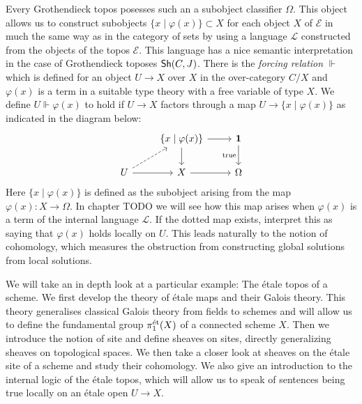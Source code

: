 Every Grothendieck topos posesses such an a subobject classifier $\Omega$. This object allows us to construct subobjects $\{x \mid \varphi(x)\} \subset X$ for each object $X$ of $\mathcal{E}$ in much the same way as in the category of sets by using a language $\mathcal{L}$ constructed from the objects of the topos $\mathcal{E}$. This language has a nice semantic interpretation in the case of Grothendieck toposes $\operatorname{\mathsf{Sh}}(C,J)$. There is the \textit{forcing relation} $\Vdash$ which is defined for an object $U \to X$ over $X$ in the over-category $C/X$ and $\varphi(x)$ is a term in a suitable type theory with a free variable of type $X$. We define $U \Vdash \varphi(x)$ to hold if $U \to X$ factors through a map $U \to \{x \mid \varphi(x)\}$ as indicated in the diagram below:
\[
	\begin{tikzcd}
		& {\{x \mid \varphi(x)\}} & {\mathbf{1}} \\
		U & X & \Omega
		\arrow[from=2-1, to=2-2]
		\arrow[dashed, from=2-1, to=1-2]
		\arrow[from=1-2, to=1-3]
		\arrow["{\text{true}}"', from=1-3, to=2-3]
		\arrow[from=1-2, to=2-2]
		\arrow[from=2-2, to=2-3]
	\end{tikzcd}
\]
Here $\{ x \mid \varphi(x)\}$ is defined as the subobject arising from the map $\varphi(x) \colon X \to \Omega$. In chapter TODO we will see how this map arises when $\varphi(x)$ is a term of the internal language $\mathcal{L}$. If the dotted map exists, interpret this as saying that $\varphi(x)$ holds locally on $U$. This leads naturally to the notion of cohomology, which measures the obstruction from constructing global solutions from local solutions.\par

We will take an in depth look at a particular example: The \'etale topos of a scheme. We first develop the theory of \'etale maps and their Galois theory. This theory generalises classical Galois theory from fields to schemes and will allow us to define the fundamental group $\pi_1^{\text{\'et}}(X)$ of a connected scheme $X$. Then we introduce the notion of site and define sheaves on sites, directly generalizing sheaves on topological spaces. We then take a closer look at sheaves on the \'etale site of a scheme and study their cohomology. We also give an introduction to the internal logic of the \'etale topos, which will allow us to speak of sentences being true locally on an \'etale open $U \to X$.\par

